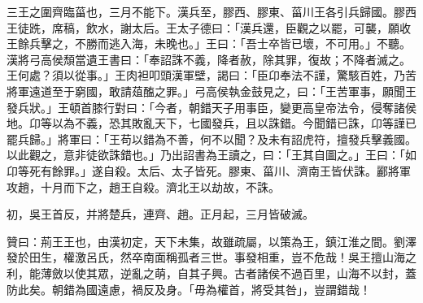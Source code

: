 \begin{pinyinscope}
三王之圍齊臨菑也，三月不能下。漢兵至，膠西、膠東、菑川王各引兵歸國。膠西王徒跣，席稿，飲水，謝太后。王太子德曰：「漢兵還，臣觀之以罷，可襲，願收王餘兵擊之，不勝而逃入海，未晚也。」王曰：「吾士卒皆已壞，不可用。」不聽。漢將弓高侯頹當遺王書曰：「奉詔誅不義，降者赦，除其罪，復故；不降者滅之。王何處？須以從事。」王肉袒叩頭漢軍壁，謁曰：「臣卬奉法不謹，驚駭百姓，乃苦將軍遠道至于窮國，敢請葅醢之罪。」弓高侯執金鼓見之，曰：「王苦軍事，願聞王發兵狀。」王頓首膝行對曰：「今者，朝錯天子用事臣，變更高皇帝法令，侵奪諸侯地。卬等以為不義，恐其敗亂天下，七國發兵，且以誅錯。今聞錯已誅，卬等謹已罷兵歸。」將軍曰：「王苟以錯為不善，何不以聞？及未有詔虎符，擅發兵擊義國。以此觀之，意非徒欲誅錯也。」乃出詔書為王讀之，曰：「王其自圖之。」王曰：「如卬等死有餘罪。」遂自殺。太后、太子皆死。膠東、菑川、濟南王皆伏誅。酈將軍攻趙，十月而下之，趙王自殺。濟北王以劫故，不誅。

初，吳王首反，并將楚兵，連齊、趙。正月起，三月皆破滅。

贊曰：荊王王也，由漢初定，天下未集，故雖疏屬，以策為王，鎮江淮之間。劉澤發於田生，權激呂氏，然卒南面稱孤者三世。事發相重，豈不危哉！吳王擅山海之利，能薄斂以使其眾，逆亂之萌，自其子興。古者諸侯不過百里，山海不以封，蓋防此矣。朝錯為國遠慮，禍反及身。「毋為權首，將受其咎」，豈謂錯哉！


\end{pinyinscope}
